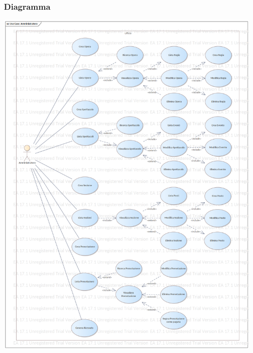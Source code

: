 \documentclass{article}
\begin{document}
            \subsubsection{Diagramma}
                \includegraphics[height=\textheight]{imgs/use_case/amministratore}
\end{document}
